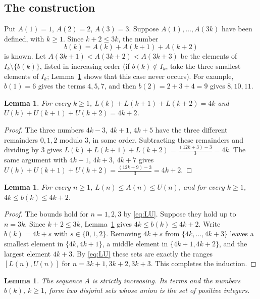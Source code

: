 \documentclass[11pt,a4paper]{article}
\newtheorem{lemma}[theorem]{Lemma}
\theoremstyle{definition}
\theoremstyle{remark}
\begin{document}
\subsection{The construction}
Put $A(1)=1$, $A(2)=2$, $A(3)=3$. Suppose $A(1),\dots,A(3k)$ have been defined, with $k\ge1$. Since $k+2\le3k$, the number
\begin{equation}\label{eq:b}
b(k)=A(k)+A(k+1)+A(k+2)
\end{equation}
is known. Let $A(3k+1)<A(3k+2)<A(3k+3)$ be the elements of $I_k\setminus\{b(k)\}$, listed in increasing order (if $b(k)\notin
I_k$, take the three smallest elements of $I_k$; Lemma~\ref{lem:bounds} shows that this case never occurs). For example,
$b(1)=6$ gives the terms $4,5,7$, and then $b(2)=2+3+4=9$ gives $8,10,11$.

\begin{lemma}\label{lem:sums}
For every $k\ge1$, $L(k)+L(k+1)+L(k+2)=4k$ and $U(k)+U(k+1)+U(k+2)=4k+2$.
\end{lemma}

\begin{proof}
The three numbers $4k-3$, $4k+1$, $4k+5$ have the three different remainders $0,1,2$ modulo $3$, in some order.
Subtracting these remainders and dividing by $3$ gives $L(k)+L(k+1)+L(k+2)=\frac{(12k+3)-3}{3}=4k$. The same argument
with $4k-1$, $4k+3$, $4k+7$ gives $U(k)+U(k+1)+U(k+2)=\frac{(12k+9)-3}{3}=4k+2$.
\end{proof}

\begin{lemma}\label{lem:bounds}
For every $n\ge1$, $L(n)\le A(n)\le U(n)$, and for every $k\ge1$, $4k\le b(k)\le4k+2$.
\end{lemma}

\begin{proof}
The bounds hold for $n=1,2,3$ by \eqref{eq:LU}. Suppose they hold up to $n=3k$. Since $k+2\le3k$, Lemma~\ref{lem:sums}
gives $4k\le b(k)\le4k+2$. Write $b(k)=4k+s$ with $s\in\{0,1,2\}$. Removing $4k+s$ from $\{4k,\dots,4k+3\}$ leaves a
smallest element in $\{4k,4k+1\}$, a middle element in $\{4k+1,4k+2\}$, and the largest element $4k+3$. By
\eqref{eq:LU} these sets are exactly the ranges $[L(n),U(n)]$ for $n=3k+1,3k+2,3k+3$. This completes the induction.
\end{proof}

\begin{lemma}\label{lem:partition}
The sequence $A$ is strictly increasing. Its terms and the numbers $b(k)$, $k\ge1$, form two disjoint sets whose union is
the set of positive integers.
\end{lemma}
\end{document}
